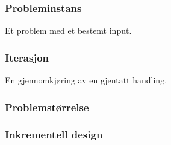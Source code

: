\subsubsection{Probleminstans}
Et problem med et bestemt input. 

\subsubsection{Iterasjon}
En gjennomkjøring av en gjentatt handling.

\subsubsection{Problemstørrelse}

\subsubsection{Inkrementell design}


